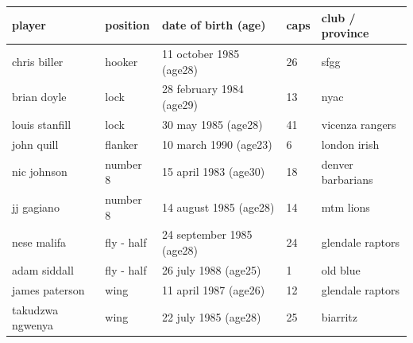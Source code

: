 \documentclass{article}
\begin{document}
\begin{tabular}{lllll}
\toprule
player & position & date of birth (age) & caps & club / province \\
\midrule
chris biller & hooker & 11 october 1985 (age28) & 26 & sfgg \\
brian doyle & lock & 28 february 1984 (age29) & 13 & nyac \\
louis stanfill & lock & 30 may 1985 (age28) & 41 & vicenza rangers \\
john quill & flanker & 10 march 1990 (age23) & 6 & london irish \\
nic johnson & number 8 & 15 april 1983 (age30) & 18 & denver barbarians \\
jj gagiano & number 8 & 14 august 1985 (age28) & 14 & mtm lions \\
nese malifa & fly - half & 24 september 1985 (age28) & 24 & glendale raptors \\
adam siddall & fly - half & 26 july 1988 (age25) & 1 & old blue \\
james paterson & wing & 11 april 1987 (age26) & 12 & glendale raptors \\
takudzwa ngwenya & wing & 22 july 1985 (age28) & 25 & biarritz \\
\bottomrule
\end{tabular}
\end{document}
